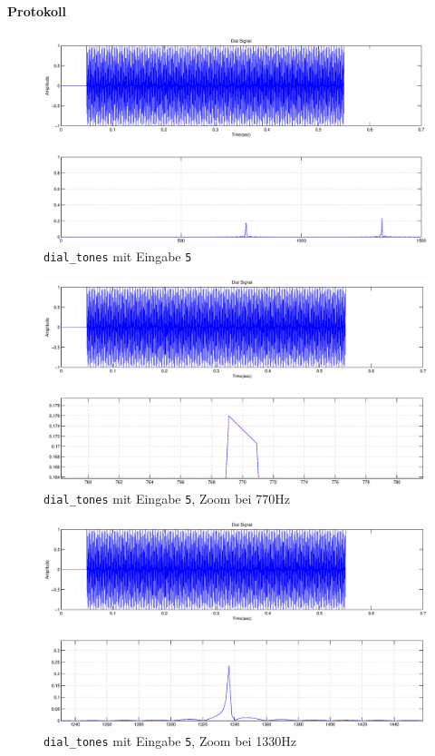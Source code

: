 \documentclass[10pt]{scrreprt}
\begin{document}
        \paragraph{Protokoll}

        \begin{center}
            \begin{figure}[H]
                \includegraphics[width=\textwidth]{img43421}
                \caption{\texttt{dial\_tones} mit Eingabe \texttt{5}}
            \end{figure}
            \begin{figure}[H]
                \includegraphics[width=\textwidth]{img43421detail}
                \caption{\texttt{dial\_tones} mit Eingabe \texttt{5}, Zoom bei 770Hz}
            \end{figure}
            \begin{figure}[H]
                \includegraphics[width=\textwidth]{img43421detail2}
                \caption{\texttt{dial\_tones} mit Eingabe \texttt{5}, Zoom bei 1330Hz}
            \end{figure}
        \end{center}
\end{document}
